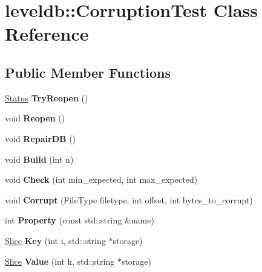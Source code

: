 \hypertarget{classleveldb_1_1_corruption_test}{}\section{leveldb\+:\+:Corruption\+Test Class Reference}
\label{classleveldb_1_1_corruption_test}
\subsection*{Public Member Functions}
\begin{DoxyCompactItemize}
\item 
\mbox{\label{classleveldb_1_1_corruption_test_aaba7c05f06400ef45d1af5cb95f66a57}} 
\mbox{\hyperlink{classleveldb_1_1_status}{Status}} {\bfseries Try\+Reopen} ()
\item 
\mbox{\label{classleveldb_1_1_corruption_test_aa2051faee6b6542d35ebdcf99918a713}} 
void {\bfseries Reopen} ()
\item 
\mbox{\label{classleveldb_1_1_corruption_test_aff36b45496c39a006a14df201ef7d57b}} 
void {\bfseries Repair\+DB} ()
\item 
\mbox{\label{classleveldb_1_1_corruption_test_a54d2114311c61356e879b5ccfc3cda18}} 
void {\bfseries Build} (int n)
\item 
\mbox{\label{classleveldb_1_1_corruption_test_aa03dcde1d0771ebbcf7d6ac8bda9c725}} 
void {\bfseries Check} (int min\+\_\+expected, int max\+\_\+expected)
\item 
\mbox{\label{classleveldb_1_1_corruption_test_a22060ac0a3697640cdcf36973339b646}} 
void {\bfseries Corrupt} (File\+Type filetype, int offset, int bytes\+\_\+to\+\_\+corrupt)
\item 
\mbox{\label{classleveldb_1_1_corruption_test_aab1ed767d1cdac7e95a32ccf6defc709}} 
int {\bfseries Property} (const std\+::string \&name)
\item 
\mbox{\label{classleveldb_1_1_corruption_test_a157c0095fca3c0a2ccaf3b8647705469}} 
\mbox{\hyperlink{classleveldb_1_1_slice}{Slice}} {\bfseries Key} (int i, std\+::string $\ast$storage)
\item 
\mbox{\label{classleveldb_1_1_corruption_test_a0afb6030faf43287b86e027a13eac152}} 
\mbox{\hyperlink{classleveldb_1_1_slice}{Slice}} {\bfseries Value} (int k, std\+::string $\ast$storage)
\end{DoxyCompactItemize}
